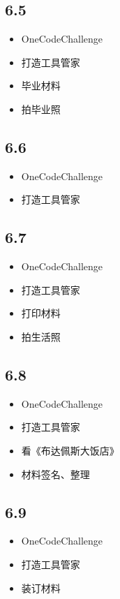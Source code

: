 \documentclass[UTF8]{ctexart}
\begin{document}
\subsection*{6.5}
\begin{itemize}
    \item OneCodeChallenge
    \item 打造工具管家
    \item 毕业材料
    \item 拍毕业照
\end{itemize}

\subsection*{6.6}
\begin{itemize}
    \item OneCodeChallenge
    \item 打造工具管家
\end{itemize}

\subsection*{6.7}
\begin{itemize}
    \item OneCodeChallenge
    \item 打造工具管家
    \item 打印材料
    \item 拍生活照
\end{itemize}

\subsection*{6.8}
\begin{itemize}
    \item OneCodeChallenge
    \item 打造工具管家
    \item 看《布达佩斯大饭店》
    \item 材料签名、整理
\end{itemize}

\subsection*{6.9}
\begin{itemize}
    \item OneCodeChallenge
    \item 打造工具管家
    \item 装订材料
\end{itemize}
\end{document}
